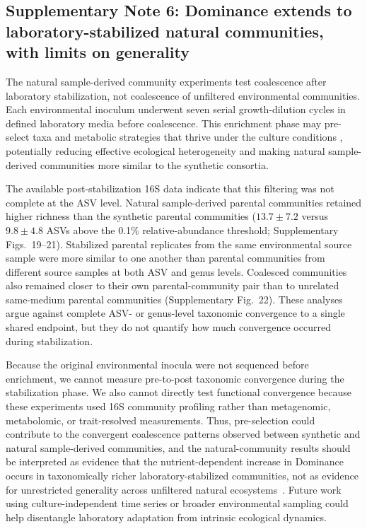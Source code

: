 \subsection*{Supplementary Note 6: Dominance extends to laboratory-stabilized natural communities, with limits on generality}
\label{sec:suppl:note6}

The natural sample-derived community experiments test coalescence after laboratory stabilization, not coalescence of unfiltered environmental communities. Each environmental inoculum underwent seven serial growth-dilution cycles in defined laboratory media before coalescence. This enrichment phase may pre-select taxa and metabolic strategies that thrive under the culture conditions \citep{Goldford2018}, potentially reducing effective ecological heterogeneity and making natural sample-derived communities more similar to the synthetic consortia.

The available post-stabilization 16S data indicate that this filtering was not complete at the ASV level. Natural sample-derived parental communities retained higher richness than the synthetic parental communities ($13.7 \pm 7.2$ versus $9.8 \pm 4.8$ ASVs above the 0.1\% relative-abundance threshold; Supplementary Figs.~19--21). Stabilized parental replicates from the same environmental source sample were more similar to one another than parental communities from different source samples at both ASV and genus levels. Coalesced communities also remained closer to their own parental-community pair than to unrelated same-medium parental communities (Supplementary Fig.~22). These analyses argue against complete ASV- or genus-level taxonomic convergence to a single shared endpoint, but they do not quantify how much convergence occurred during stabilization.

Because the original environmental inocula were not sequenced before enrichment, we cannot measure pre-to-post taxonomic convergence during the stabilization phase. We also cannot directly test functional convergence because these experiments used 16S community profiling rather than metagenomic, metabolomic, or trait-resolved measurements. Thus, pre-selection could contribute to the convergent coalescence patterns observed between synthetic and natural sample-derived communities, and the natural-community results should be interpreted as evidence that the nutrient-dependent increase in Dominance occurs in taxonomically richer laboratory-stabilized communities, not as evidence for unrestricted generality across unfiltered natural ecosystems~\citep{Rillig2015,Castledine2020,Rillig2017,Liu2024}. Future work using culture-independent time series or broader environmental sampling could help disentangle laboratory adaptation from intrinsic ecological dynamics.
